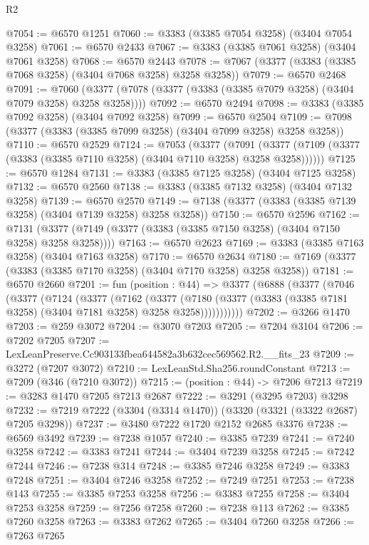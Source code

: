 \begin{lexlean}{R2}
\begin{coremodule}
@7054 := @6570 @1251
@7060 := @3383 (@3385 @7054 @3258) (@3404 @7054 @3258)
@7061 := @6570 @2433
@7067 := @3383 (@3385 @7061 @3258) (@3404 @7061 @3258)
@7068 := @6570 @2443
@7078 := @7067 (@3377 (@3383 (@3385 @7068 @3258) (@3404 @7068 @3258) @3258 @3258))
@7079 := @6570 @2468
@7091 := @7060 (@3377 (@7078 (@3377 (@3383 (@3385 @7079 @3258) (@3404 @7079 @3258) @3258 @3258))))
@7092 := @6570 @2494
@7098 := @3383 (@3385 @7092 @3258) (@3404 @7092 @3258)
@7099 := @6570 @2504
@7109 := @7098 (@3377 (@3383 (@3385 @7099 @3258) (@3404 @7099 @3258) @3258 @3258))
@7110 := @6570 @2529
@7124 := @7053
    (@3377
      (@7091 (@3377 (@7109 (@3377 (@3383 (@3385 @7110 @3258) (@3404 @7110 @3258) @3258 @3258))))))
@7125 := @6570 @1284
@7131 := @3383 (@3385 @7125 @3258) (@3404 @7125 @3258)
@7132 := @6570 @2560
@7138 := @3383 (@3385 @7132 @3258) (@3404 @7132 @3258)
@7139 := @6570 @2570
@7149 := @7138 (@3377 (@3383 (@3385 @7139 @3258) (@3404 @7139 @3258) @3258 @3258))
@7150 := @6570 @2596
@7162 := @7131 (@3377 (@7149 (@3377 (@3383 (@3385 @7150 @3258) (@3404 @7150 @3258) @3258 @3258))))
@7163 := @6570 @2623
@7169 := @3383 (@3385 @7163 @3258) (@3404 @7163 @3258)
@7170 := @6570 @2634
@7180 := @7169 (@3377 (@3383 (@3385 @7170 @3258) (@3404 @7170 @3258) @3258 @3258))
@7181 := @6570 @2660
@7201 := fun (position : @44) =>
  @3377
    (@6888
      (@3377
        (@7046
          (@3377
            (@7124
              (@3377
                (@7162
                  (@3377
                    (@7180
                      (@3377 (@3383 (@3385 @7181 @3258) (@3404 @7181 @3258) @3258 @3258)))))))))))
@7202 := @3266 @1470
@7203 := @259 @3072
@7204 := @3070 @7203
@7205 := @7204 @3104
@7206 := @7202 @7205
@7207 := LexLeanPreserve.Cc903133fbea644582a3b632cec569562.R2.__fits_23
@7209 := @3272 (@7207 @3072)
@7210 := LexLeanStd.Sha256.roundConstant
@7213 := @7209 (@346 (@7210 @3072))
@7215 := (position : @44) -> @7206 @7213
@7219 := @3283 @1470 @7205 @7213 @2687
@7222 := @3291 (@3295 @7203) @3298
@7232 := @7219 @7222 (@3304 (@3314 @1470)) (@3320 (@3321 (@3322 @2687) @7205 @3298))
@7237 := @3480 @7222 @1720 @2152 @2685 @3376
@7238 := @6569 @3492
@7239 := @7238 @1057
@7240 := @3385 @7239
@7241 := @7240 @3258
@7242 := @3383 @7241
@7244 := @3404 @7239 @3258
@7245 := @7242 @7244
@7246 := @7238 @314
@7248 := @3385 @7246 @3258
@7249 := @3383 @7248
@7251 := @3404 @7246 @3258
@7252 := @7249 @7251
@7253 := @7238 @143
@7255 := @3385 @7253 @3258
@7256 := @3383 @7255
@7258 := @3404 @7253 @3258
@7259 := @7256 @7258
@7260 := @7238 @113
@7262 := @3385 @7260 @3258
@7263 := @3383 @7262
@7265 := @3404 @7260 @3258
@7266 := @7263 @7265

\end{coremodule}
\end{lexlean}

